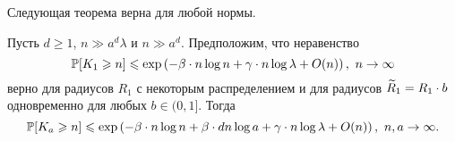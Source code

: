 
Следующая теорема верна для любой нормы. 
\begin{thm}\label{uppgen}
Пусть $d\geq 1$,  $n \gg a^d\lambda$ и $n \gg a^d$. 
Предположим, что неравенство 
\begin{equation*}
    \mathbb{P}[K_1 \geqslant n] \leqslant \exp \left(-\beta\cdot n\log n + \gamma\cdot n\log\lambda + O(n)\right),\  n \to \infty
\end{equation*}{}
верно для радиусов $R_1$ с некоторым распределением и для радиусов $\widetilde R_1 = R_1\cdot b$ одновременно для любых $b\in (0, 1]$.
Тогда 
\begin{equation*}
    \mathbb{P}[K_a \geqslant n] \leqslant \exp \left(-\beta\cdot n\log n + \beta\cdot dn\log a + \gamma\cdot n\log\lambda + O(n)\right),\  n, a \to \infty.
\end{equation*}{}
\end{thm}

